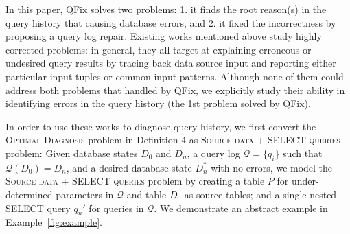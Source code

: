 \documentclass{vldb}
\newcounter{prob}
\newcommand{\sys}{QFix\xspace}
\begin{document}
In this paper, \sys solves two problems: 1. it finds the root reason(s) in the query history that causing database errors, and 2. it fixed the incorrectness by proposing a query log repair. Existing works mentioned above study highly corrected problems: in general, they all target at explaining erroneous or undesired query results by tracing back data source input and reporting either particular input tuples or common input patterns. Although none of them could address both problems that handled by \sys, we explicitly study their ability in identifying errors in the query history (the 1st problem solved by \sys). 

In order to use these works to diagnose query history, we first convert the \textsc{Optimal Diagnosis} problem in Definition 4 as \textsc{Source data + SELECT queries} problem:
Given database states $D_0$ and $D_n$, a query log $\mathcal{Q} = \{q_i\}$ such that $\mathcal{Q}(D_0) = D_n$, and a desired database state $D_n^*$ with no errors, we model the \textsc{Source data + SELECT queries} problem by creating a table $P$ for under-determined parameters in $\mathcal{Q}$ and table $D_0$ as source tables; and a single nested SELECT query $q_n'$ for queries in $\mathcal{Q}$. We demonstrate an abstract example in Example~\ref{fig:example}.
\end{document}
